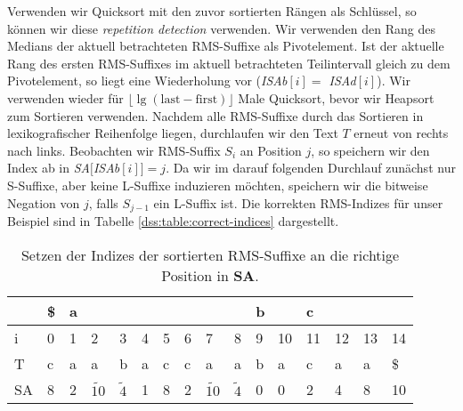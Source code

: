 Verwenden wir Quicksort mit den zuvor sortierten Rängen als Schlüssel, so können wir diese \textit{repetition detection} verwenden. Wir verwenden den Rang des Medians der aktuell betrachteten RMS-Suffixe als Pivotelement. Ist der aktuelle Rang des ersten RMS-Suffixes im aktuell betrachteten Teilintervall gleich zu dem Pivotelement, so liegt eine Wiederholung vor (\textit{ISAb$[i] = $ ISAd$[i]$}). Wir verwenden wieder für $\lfloor \lg (\text{last} - \text{first})\rfloor $ Male Quicksort, bevor wir Heapsort zum Sortieren verwenden. Nachdem alle RMS-Suffixe durch das Sortieren in lexikografischer Reihenfolge liegen, durchlaufen wir den Text $T$ erneut von rechts nach links. Beobachten wir RMS-Suffix $S_i$ an Position $j$, so speichern wir den Index ab in \textit{SA$[$ISAb$[i]] = j$}. Da wir im darauf folgenden Durchlauf zunächst nur S-Suffixe, aber keine L-Suffixe induzieren möchten, speichern wir die bitweise Negation von $j$, falls $S_{j-1}$ ein L-Suffix ist. Die korrekten RMS-Indizes für unser Beispiel sind in Tabelle \ref{dss:table:correct-indices} dargestellt.

\begin{table}
	\begin{tabular}{l|lllllllllllllll}
		& \multicolumn{1}{l|}{\$} & \multicolumn{8}{l|}{a}                                                                                                                                                                  & \multicolumn{2}{l|}{b} & \multicolumn{4}{l|}{c} \\ \hline
		i  & 0                       & 1 & 2                & 3               & 4 & 5                         & 6                         & 7                                        & 8                                       & 9         & 10        & 11   & 12  & 13  & 14  \\ \hline
		T  & c                       & a & a                & b               & a & c                         & c                         & a                                        & a                                       & b         & a         & c    & a   & a   & \$  \\ \hline
		SA & 8                       & 2 & $\widetilde{10}$ & $\widetilde{4}$ & 1 & \cellcolor[HTML]{32CB00}8 & \cellcolor[HTML]{32CB00}2 & \cellcolor[HTML]{32CB00}$\widetilde{10}$ & \cellcolor[HTML]{32CB00}$\widetilde{4}$ & 0         & 0         & 2    & 4   & 8   & 10  \\ \hline
	\end{tabular}
	\caption{Setzen der Indizes der sortierten RMS-Suffixe an die richtige Position in \textbf{SA}.}
	\label{dss:table:final-sort}
\end{table}

